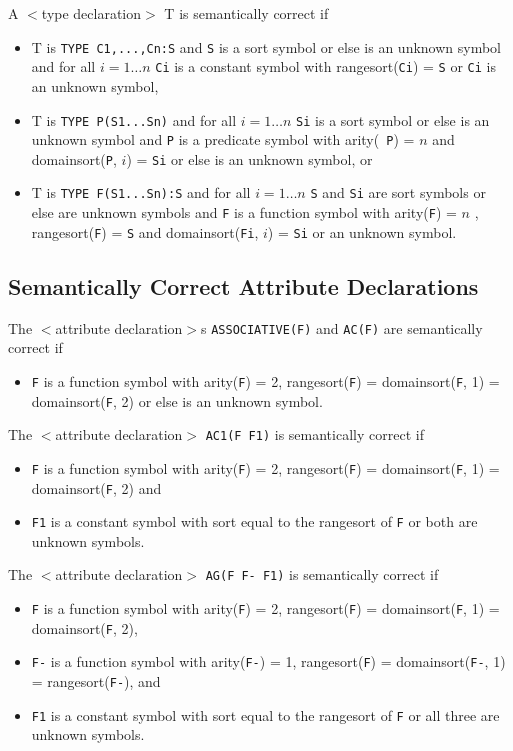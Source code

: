 A $<$type declaration$>$ T is semantically correct if 
\begin{itemize}
\item T is {\tt TYPE C1,...,Cn:S} and {\tt S} is a sort symbol or else is an unknown 
symbol and for all $i=1\ldots n$ {\tt Ci} is a 
constant symbol with rangesort({\tt Ci}) = {\tt S} or {\tt Ci} is an unknown symbol,
\item T is {\tt TYPE P(S1...Sn)}  and for all $i=1\ldots n$ {\tt Si} is a sort symbol or else is 
an unknown symbol  and {\tt P} is a predicate symbol with arity({\tt
P}) = $n$  and 
domainsort({\tt P}, $i$) = {\tt Si} or else is an unknown symbol, or
\item T is {\tt TYPE F(S1...Sn):S} and for all $i=1\ldots n$ {\tt S} and {\tt Si} are sort symbols or 
else are unknown symbols  and {\tt F} 
is a function symbol with arity({\tt F}) = $n$ , rangesort({\tt F}) = 
{\tt S}  and 
domainsort({\tt Fi}, $i$) = {\tt Si}  or an unknown symbol.
\end{itemize}


\subsection{Semantically Correct Attribute Declarations}
\label{SemanticallyCorrectAttributeDeclarations} 


The $<$attribute declaration$>$s {\tt ASSOCIATIVE(F)} and {\tt AC(F)} are semantically correct if 
\begin{itemize}
\item {\tt F} is a function symbol with arity({\tt F}) = 2, rangesort({\tt F}) = 
domainsort({\tt F}, 1) = domainsort({\tt F}, 2) or else is an unknown 
symbol.
\end{itemize}

The $<$attribute declaration$>$ {\tt AC1(F F1)} is semantically correct if 
\begin{itemize}
\item {\tt F} is a function symbol with arity({\tt F}) = 2, rangesort({\tt F}) = 
domainsort({\tt F}, 1) = domainsort({\tt F}, 2) 
and \item {\tt F1} is  a constant symbol with sort equal to the rangesort
of {\tt F} or both are unknown symbols.
\end{itemize}

The $<$attribute declaration$>$ {\tt AG(F F- F1)} is semantically correct if 
\begin{itemize}
\item {\tt F} is a function symbol with arity({\tt F}) = 2,
rangesort({\tt F}) = domainsort({\tt F}, 1) = domainsort({\tt F}, 2),
\item {\tt F-} is a function symbol with arity({\tt F-}) = 1,
rangesort({\tt F}) = domainsort({\tt F-}, 1) = rangesort({\tt F-}), and
\item {\tt F1} is  a constant symbol with sort equal to the rangesort
of {\tt F} or all three are unknown symbols.
\end{itemize}



